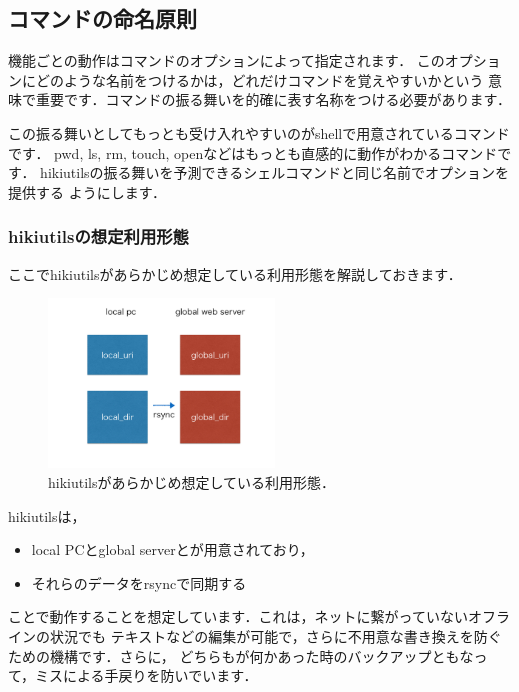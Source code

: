 
\subsection{コマンドの命名原則}
機能ごとの動作はコマンドのオプションによって指定されます．
このオプションにどのような名前をつけるかは，どれだけコマンドを覚えやすいかという
意味で重要です．コマンドの振る舞いを的確に表す名称をつける必要があります．

この振る舞いとしてもっとも受け入れやすいのがshellで用意されているコマンドです．
pwd, ls, rm, touch, openなどはもっとも直感的に動作がわかるコマンドです．
hikiutilsの振る舞いを予測できるシェルコマンドと同じ名前でオプションを提供する
ようにします．

\subsubsection{hikiutilsの想定利用形態}
ここでhikiutilsがあらかじめ想定している利用形態を解説しておきます．

\begin{figure}[htbp]\begin{center}
\includegraphics[width=6cm,bb=0 0 442 432]{../figs/./hikiutils_yamane.002.jpg}
\caption{hikiutilsがあらかじめ想定している利用形態．}
\label{default}\end{center}\end{figure}
hikiutilsは，

\begin{itemize}
\item local PCとglobal serverとが用意されており，
\item それらのデータをrsyncで同期する
\end{itemize}
ことで動作することを想定しています．これは，ネットに繋がっていないオフラインの状況でも
テキストなどの編集が可能で，さらに不用意な書き換えを防ぐための機構です．さらに，
どちらもが何かあった時のバックアップともなって，ミスによる手戻りを防いでいます．

